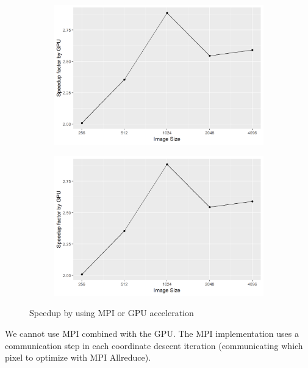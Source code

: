 \begin{figure}[h]
	\centering
		\begin{subfigure}[b]{0.4\linewidth}
		\includegraphics[width=1.00\linewidth]{./chapters/10.results/speedup/gpu.png}
	\end{subfigure}
	\begin{subfigure}[b]{0.4\linewidth}
		\includegraphics[width=1.00\linewidth]{./chapters/10.results/speedup/gpu.png}
	\end{subfigure}
	\caption{Speedup by using MPI or GPU acceleration}
	\label{results:speedup}
\end{figure}


We cannot use MPI combined with the GPU. The MPI implementation uses a communication step in each coordinate descent iteration (communicating which pixel to optimize with MPI Allreduce). 




